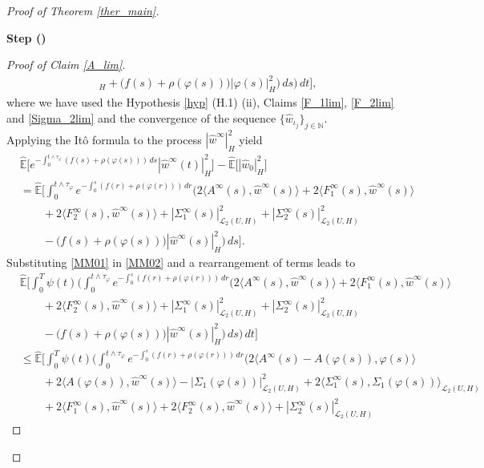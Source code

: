 \documentclass[english,a4paper,11pt]{amsart}
\theoremstyle{plain}
\theoremstyle{definition}
\theoremstyle{remark}
\numberwithin{equation}{section}
\newcounter{lil1}
\newenvironment{step}
{\begin{list} { \bf Step (\Roman{lil1})}
		{ \usecounter{lil1}
			\setlength{\leftmargin}{0.0cm}
			\setlength{\topsep}{0.2cm}
			\setlength{\itemsep}{0.0cm}
			\setlength{\parsep}{0.1cm}
			\setlength{\itemindent}{0.8cm}
			\setlength{\parskip}{0.0cm}}}
	{\end{list}}
\newcounter{lil33}
\newcounter{lil1q}
\newcommand{\wh}{\widehat}
\newcommand{\la}{\langle}
\newcommand{\ra}{\rangle}
\newcommand{\EE}{ \mathbb{E} }
\newcommand{\N}{\mathbb{N}}
\begin{document}
\begin{proof}[Proof of Theorem \ref{ther_main}]
\begin{step}
\begin{proof}[Proof of Claim \ref{A_lim}]
\begin{align}
	_H 
	+\big(f(s)+\rho(\varphi(s))\big) | \varphi(s) | _H^2\bigg)\,ds\bigg)\,dt  \bigg],
\end{align}where we have used the Hypothesis \ref{hyp} (H.1) (ii), Claims \ref{F_1lim}, \ref{F_2lim} and \ref{Sigma_2lim} and the convergence of the sequence $\{\wh{w}_{\iota_j}\}_{j\in\N}$. \\
Applying the It\^o formula to the process $ | \wh{w}^\infty | _H^2$ yield
\begin{align}\label{MM02}\nonumber
&	\wh{\EE}\bigg[e^{-\int_0^{t\wedge \tau_\varphi}(f(s)+\rho(\varphi(s)))\,ds}  | \wh{w}^\infty(t) | _H^2
	\bigg]-\wh{\EE}\big[ | \wh{w}_0 | _H^2\big]
	\\& \nonumber
	= \wh{\EE}\bigg[\int_0^{t\wedge \tau_\varphi}e^{-\int_0^{s}(f(r)+\rho(\varphi(r)))\, dr}\Big(2\la A^{\infty}(s),\wh{w}^{\infty}(s)\ra +2\la F_1^{\infty}(s),\wh{w}^{\infty}(s)\ra\\&\nonumber\qquad +2\la F_2^{\infty}(s),\wh{w}^{\infty}(s)\ra+  | \Sigma_1^\infty(s) | _{\mathcal{L}_2(U,H)}^2+ | \Sigma_2^\infty(s) | _{\mathcal{L}_2(U,H)}^2\\&\qquad -\big(f(s)+\rho(\varphi(s))\big) | \wh{w}^\infty(s) | _H^2\Big)\,ds \bigg].
\end{align}Substituting \eqref{MM01} in \eqref{MM02} and a rearrangement of terms leads to
\begin{align}\label{MM03}\nonumber
&	\wh{\EE}\bigg[\int_0^T \psi(t)\bigg(\int_0^{t\wedge \tau_\varphi}e^{-\int_0^{s}(f(r)+\rho(\varphi(r)))\, dr}\Big(2\la A^{\infty}(s),\wh{w}^{\infty}(s)\ra +2\la F_1^{\infty}(s),\wh{w}^{\infty}(s)\ra\\&\nonumber\qquad +2\la F_2^{\infty}(s),\wh{w}^{\infty}(s)\ra+  | \Sigma_1^\infty(s) | _{\mathcal{L}_2(U,H)}^2+ | \Sigma_2^\infty(s) | _{\mathcal{L}_2(U,H)}^2\\&\qquad\nonumber -\big(f(s)+\rho(\varphi(s))\big) | \wh{w}^\infty(s) | _H^2\Big)\,ds\bigg)\,dt \bigg] 
	\\& \nonumber\leq 
	{\wh{\EE}}
	\bigg[\int_0^T\psi(t)\bigg( \int_0^{t\wedge \tau_{\varphi}} e^{-\int_0^{s}(f(r)+\rho(\varphi(r)))\, dr}\bigg(2\la A^{\infty} (s)-A(\varphi(s)),\varphi(s)\ra \\&\nonumber\qquad +2\la A	(\varphi(s)),{\wh{w}}^\infty(s)\ra - | \Sigma_1(\varphi(s)) | _{\mathcal{L}_2(U,H)}^2
	+2\la \Sigma_1^{\infty}(s), \Sigma_1(\varphi(s))\ra_{\mathcal{L}_2(U,H)}
	\\&\nonumber\qquad +2\la  F_1^{\infty}(s),\wh{w}^\infty(s)\ra  +2\la  F_2^{\infty}(s),\wh{w}^\infty(s)\ra + | \Sigma_2^{\infty}(s) | _{\mathcal{L}_2(U,H)}^2

\end{align}
\end{proof}
\end{step}
\end{proof}
\end{document}
